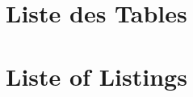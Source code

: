 \documentclass[a4paper,11pt,fleqn]{book}
\begin{document}
\chapter{Liste des Tables}
\listoftables

\cleardoublepage
{}
\chapter{Liste of Listings}
\listoflistings

\appendix



\listoftodos

\backmatter
\end{document}
